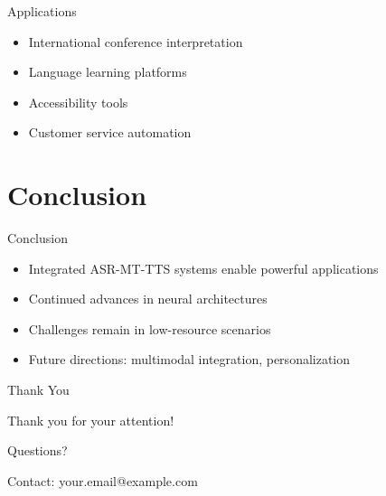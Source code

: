\documentclass{beamer}
\begin{document}
\begin{frame}{Applications}
\begin{itemize}
\item International conference interpretation
\item Language learning platforms
\item Accessibility tools
\item Customer service automation
\end{itemize}
\end{frame}

\section{Conclusion}

\begin{frame}{Conclusion}
\begin{itemize}
\item Integrated ASR-MT-TTS systems enable powerful applications
\item Continued advances in neural architectures
\item Challenges remain in low-resource scenarios
\item Future directions: multimodal integration, personalization
\end{itemize}
\end{frame}

\begin{frame}{Thank You}
\begin{center}
{\Large Thank you for your attention!}

\vspace{1cm}

Questions?

\vspace{1cm}

\small
Contact: your.email@example.com
\end{center}
\end{frame}
\end{document}
